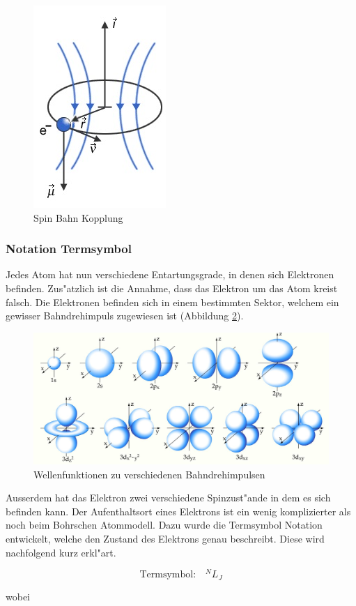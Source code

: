 \begin{refsection}
\begin{figure}
	\centering
	\includegraphics[width=.2\columnwidth]{atomuhr/feinstrukturelektron.jpg}
	\caption{Spin Bahn Kopplung \cite{pic:feinstruktur}}
	\label{atomuhr:spinbahn}
\end{figure}

\subsubsection{Notation Termsymbol}
Jedes Atom hat nun verschiedene Entartungsgrade, in denen sich
Elektronen befinden. Zus"atzlich ist die Annahme, dass das Elektron um
das Atom kreist falsch. Die Elektronen befinden sich in einem
bestimmten Sektor, welchem ein gewisser Bahndrehimpuls zugewiesen ist (Abbildung \ref{atomuhr:bahndrehimpuls}).
\begin{figure}
	\centering
	\includegraphics[width = 0.8\columnwidth]{atomuhr/orbitale.JPG}
	\caption{Wellenfunktionen zu verschiedenen Bahndrehimpulsen \cite{pic:orbitale}}
	\label{atomuhr:bahndrehimpuls}
\end{figure}
Ausserdem hat das Elektron zwei verschiedene Spinzust"ande in dem es
sich befinden kann. Der Aufenthaltsort eines Elektrons ist ein wenig
komplizierter als noch beim Bohrschen Atommodell.  Dazu wurde die
Termsymbol Notation entwickelt, welche den Zustand des Elektrons genau
beschreibt.  Diese wird nachfolgend kurz erkl"art.

\begin{equation}
	\text{Termsymbol:} \quad ^NL _J
\end{equation}

wobei


\end{refsection}

